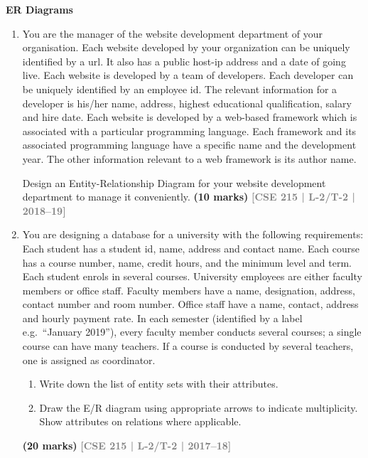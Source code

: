 \documentclass[12pt]{article}
\newcommand{\yr}[1]{\hfill\textcolor{gray}{\small\textbf{[#1]}}}
\newcommand{\mk}[1]{\textcolor{orange!70!black}{\small\textbf{(#1 marks)}}}
\newcounter{subtopicbm}
\newcommand{\subtopic}[2]{%
  \stepcounter{subtopicbm}%
  \pdfbookmark[2]{#2}{subtopicbm.\thesubtopicbm}%
  \vspace{10pt}
  \noindent\begin{tcolorbox}[colback=#1!8,colframe=#1,boxrule=0.6pt,arc=4pt,
    left=6pt,right=6pt,top=4pt,bottom=4pt]
    \small\bfseries\textcolor{#1}{#2}
  \end{tcolorbox}
  \vspace{2pt}
}
\begin{document}
\subtopic{cA}{ER Diagrams}\label{sub:s2-erdiag}

\begin{enumerate}


\item You are the manager of the website development department of your organisation.
Each website developed by your organization can be uniquely identified by a url. It also has
a public host-ip address and a date of going live. Each website is developed by a team of
developers. Each developer can be uniquely identified by an employee id. The relevant information
for a developer is his/her name, address, highest educational qualification, salary
and hire date. Each website is developed by a web-based framework which is associated
with a particular programming language. Each framework and its associated programming
language have a specific name and the development year. The other information relevant
to a web framework is its author name.

Design an Entity-Relationship Diagram for your website development department to manage it conveniently. 
\mk{10} \yr{CSE 215 | L-2/T-2 | 2018--19}


\item You are designing a database for a university with the following requirements: Each student has a student id, name, address and contact name. Each course has a course number, name, credit hours, and the minimum level and term. Each student enrols in several courses. University employees are either faculty members or office staff. Faculty members have a name, designation, address, contact number and room number. Office staff have a name, contact, address and hourly payment rate. In each semester (identified by a label e.g.\ ``January 2019''), every faculty member conducts several courses; a single course can have many teachers. If a course is conducted by several teachers, one is assigned as coordinator.
\begin{enumerate}
  \item Write down the list of entity sets with their attributes.
  \item Draw the E/R diagram using appropriate arrows to indicate multiplicity. Show attributes on relations where applicable.
\end{enumerate}
\mk{20} \yr{CSE 215 | L-2/T-2 | 2017--18}



\end{enumerate}
\end{document}

